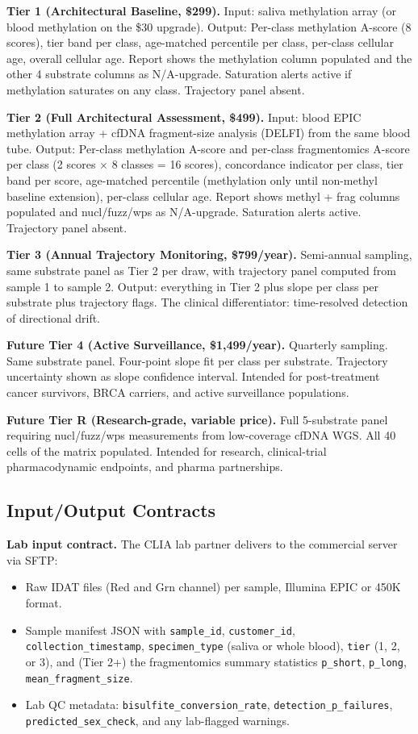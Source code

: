 \documentclass[12pt,a4paper]{article}
\begin{document}
\textbf{Tier 1 (Architectural Baseline, \$299).} Input: saliva
methylation array (or blood methylation on the \$30 upgrade). Output:
Per-class methylation A-score (8 scores), tier band per class,
age-matched percentile per class, per-class cellular age, overall
cellular age. Report shows the methylation column populated and the
other 4 substrate columns as N/A-upgrade. Saturation alerts active
if methylation saturates on any class. Trajectory panel absent.

\textbf{Tier 2 (Full Architectural Assessment, \$499).} Input: blood
EPIC methylation array + cfDNA fragment-size analysis (DELFI) from
the same blood tube. Output: Per-class methylation A-score and
per-class fragmentomics A-score per class (2 scores $\times$ 8
classes = 16 scores), concordance indicator per class, tier band
per score, age-matched percentile (methylation only until non-methyl
baseline extension), per-class cellular age. Report shows methyl +
frag columns populated and nucl/fuzz/wps as N/A-upgrade. Saturation
alerts active. Trajectory panel absent.

\textbf{Tier 3 (Annual Trajectory Monitoring, \$799/year).}
Semi-annual sampling, same substrate panel as Tier 2 per draw,
with trajectory panel computed from sample 1 to sample 2. Output:
everything in Tier 2 plus slope per class per substrate plus
trajectory flags. The clinical differentiator: time-resolved
detection of directional drift.

\textbf{Future Tier 4 (Active Surveillance, \$1,499/year).} Quarterly
sampling. Same substrate panel. Four-point slope fit per class per
substrate. Trajectory uncertainty shown as slope confidence interval.
Intended for post-treatment cancer survivors, BRCA carriers, and
active surveillance populations.

\textbf{Future Tier R (Research-grade, variable price).} Full
5-substrate panel requiring nucl/fuzz/wps measurements from
low-coverage cfDNA WGS. All 40 cells of the matrix populated.
Intended for research, clinical-trial pharmacodynamic endpoints,
and pharma partnerships.

\subsection{Input/Output Contracts}
\label{subsec:io_contracts}

\textbf{Lab input contract.} The CLIA lab partner delivers to the
commercial server via SFTP:
\begin{itemize}
\item Raw IDAT files (Red and Grn channel) per sample, Illumina EPIC
or 450K format.
\item Sample manifest JSON with \texttt{sample\_id},
\texttt{customer\_id}, \texttt{collection\_timestamp},
\texttt{specimen\_type} (saliva or whole blood),
\texttt{tier} (1, 2, or 3), and (Tier 2+) the fragmentomics summary
statistics \texttt{p\_short}, \texttt{p\_long},
\texttt{mean\_fragment\_size}.
\item Lab QC metadata: \texttt{bisulfite\_conversion\_rate},
\texttt{detection\_p\_failures}, \texttt{predicted\_\allowbreak sex\_check},
and any lab-flagged warnings.
\end{itemize}
\end{document}
